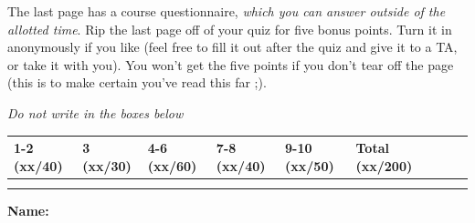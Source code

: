 \documentclass[11pt]{article}
\newcounter{answer}
\begin{document}
\begin{center}
\begin{boxedminipage}[h]{6in}
\vspace{.05in} 
The last page has a course questionnaire, {\em which you can
answer outside of the allotted time}.  Rip the last page off of your
quiz for five bonus points.  Turn it in anonymously if you like (feel
free to fill it out after the quiz and give it to a TA, or take it with
you).  
You
won't get the five points if you don't tear off the page (this is to
make certain you've read this far ;).
\fi 

\end{boxedminipage}
\end{center}
\vspace*{0.05in}
\begin{center}
{\it Do not write in the boxes below}
\end{center}

\begin{center}
\begin{tabular}{|l|l|l|l|l|l|l|l|l|} \hline \hline
{\bf 1-2 (xx/40)} & {\bf 3 (xx/30)} & {\bf 4-6 (xx/60)} & {\bf 7-8
  (xx/40)} & {\bf 9-10 (xx/50)} & {\bf Total
  (xx/200)}  \\ \hline 
& & & & & \\ 
& & & & & \\ \hline \hline
\end{tabular}
\end{center}

\vspace{.1in}
{\bf\Large{Name:}}

\newpage
\pagestyle{fancy}








\label{lastpage}
\end{document}
